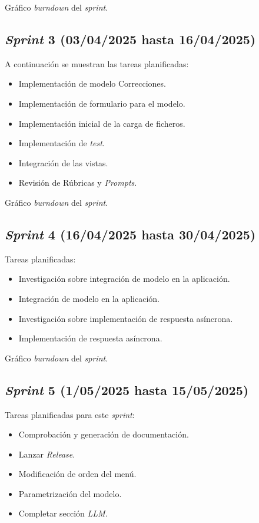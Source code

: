Gráfico \textit{burndown} del \textit{sprint}.

\subsection{\emph{Sprint} 3 (03/04/2025 hasta 16/04/2025)}
A continuación se muestran las tareas planificadas:
\begin{itemize}
    \item Implementación de modelo Correcciones.
    \item Implementación de formulario para el modelo.
    \item Implementación inicial de la carga de ficheros.
    \item Implementación de \textit{test}.
    \item Integración de las vistas.
    \item Revisión de Rúbricas y \textit{Prompts}.
\end{itemize}

Gráfico \textit{burndown} del \textit{sprint}.

\subsection{\emph{Sprint} 4 (16/04/2025 hasta 30/04/2025)}
Tareas planificadas:
\begin{itemize}
    \item Investigación sobre integración de modelo en la aplicación.
    \item Integración de modelo en la aplicación.
    \item Investigación sobre implementación de respuesta asíncrona.
    \item Implementación de respuesta asíncrona.
\end{itemize}

Gráfico \textit{burndown} del \textit{sprint}.

\subsection{\emph{Sprint} 5 (1/05/2025 hasta 15/05/2025)}
Tareas planificadas para este \textit{sprint}:
\begin{itemize}
    \item Comprobación y generación de documentación.
    \item Lanzar \textit{Release}.
    \item Modificación de orden del menú.
    \item Parametrización del modelo.
    \item Completar sección \textit{LLM}.
\end{itemize}

